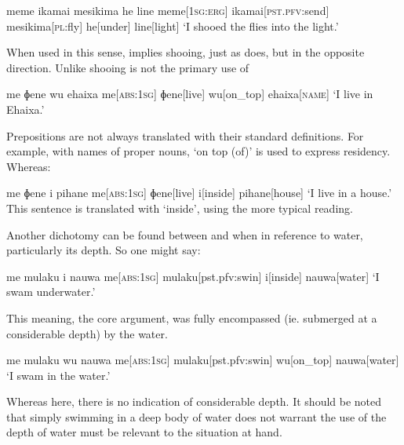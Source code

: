 \ex
\begingl
\glpreamble meme ikamai mesikima he line
\endpreamble
meme[\textsc{1sg:erg}]
ikamai[\textsc{pst.pfv:}send]
mesikima[\textsc{pl:}fly]
he[under]
line[light]
\glft `I shooed the flies into the light.'\footnotemark
\endgl
\xe

When used in this sense,  implies shooing, just as  does, but in the opposite direction. Unlike  shooing is not the primary use of 


\ex
\begingl
\glpreamble me ɸene wu ehaixa
\endpreamble
me[\textsc{abs:1sg}]
ɸene[live]
wu[on\_top]
ehaixa[\textsc{name}]
\glft `I live in Ehaixa.'
\endgl
\xe

Prepositions are not always translated with their standard definitions. For example, with names of proper nouns,  `on top (of)' is used to express residency. Whereas:

\ex
\begingl
\glpreamble me ɸene i pihane
\endpreamble
me[\textsc{abs:1sg}]
ɸene[live]
i[inside]
pihane[house]
\glft `I live in a house.'
\endgl
\xe
This sentence is translated with  `inside', using the more typical reading.

Another dichotomy can be found between  and  when in reference to water, particularly its depth. So one might say:

\ex
\begingl
\glpreamble me mulaku i nauwa
\endpreamble
me[\textsc{abs:1sg}]
mulaku[pst.pfv:swin]
i[inside]
nauwa[water]
\glft `I swam underwater.'
\endgl
\xe

This meaning, the core argument,  was fully encompassed (ie. submerged at a considerable depth) by the water.

\ex
\begingl
\glpreamble me mulaku wu nauwa
\endpreamble
me[\textsc{abs:1sg}]
mulaku[pst.pfv:swin]
wu[on\_top]
nauwa[water]
\glft `I swam in the water.'
\endgl
\xe

Whereas here, there is no indication of considerable depth. It should be noted that simply swimming in a deep body of water does not warrant the use of  the depth of water must be relevant to the situation at hand.

